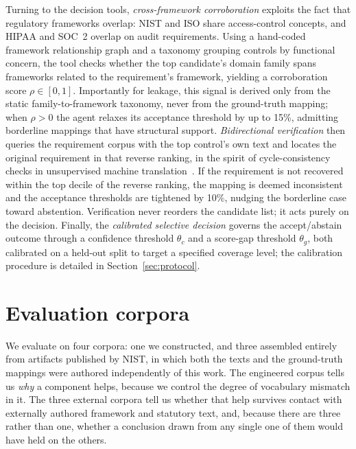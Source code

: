 \documentclass[a4paper,fleqn]{cas-sc}
\begin{document}
Turning to the decision tools, \emph{cross-framework corroboration} exploits the fact that regulatory frameworks overlap: NIST and ISO share access-control concepts, and HIPAA and SOC~2 overlap on audit requirements.
Using a hand-coded framework relationship graph and a taxonomy grouping controls by functional concern, the tool checks whether the top candidate's domain family spans frameworks related to the requirement's framework, yielding a corroboration score $\rho \in [0, 1]$.
Importantly for leakage, this signal is derived only from the static family-to-framework taxonomy, never from the ground-truth mapping; when $\rho > 0$ the agent relaxes its acceptance threshold by up to 15\%, admitting borderline mappings that have structural support.
\emph{Bidirectional verification} then queries the requirement corpus with the top control's own text and locates the original requirement in that reverse ranking, in the spirit of cycle-consistency checks in unsupervised machine translation~\citep{Lample2018}. If the requirement is not recovered within the top decile of the reverse ranking, the mapping is deemed inconsistent and the acceptance thresholds are tightened by 10\%, nudging the borderline case toward abstention. Verification never reorders the candidate list; it acts purely on the decision.
Finally, the \emph{calibrated selective decision} governs the accept/abstain outcome through a confidence threshold $\theta_c$ and a score-gap threshold $\theta_g$, both calibrated on a held-out split to target a specified coverage level; the calibration procedure is detailed in Section~\ref{sec:protocol}.


\section{Evaluation corpora}
\label{sec:dataset}

We evaluate on four corpora: one we constructed, and three assembled entirely from artifacts published by NIST, in which both the texts and the ground-truth mappings were authored independently of this work.
The engineered corpus tells us \emph{why} a component helps, because we control the degree of vocabulary mismatch in it.
The three external corpora tell us whether that help survives contact with externally authored framework and statutory text, and, because there are three rather than one, whether a conclusion drawn from any single one of them would have held on the others.
\end{document}
